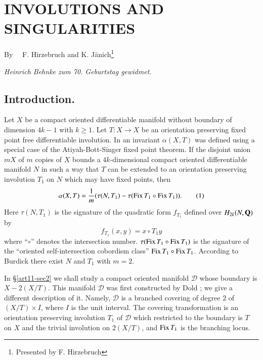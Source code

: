 \chapter[\textsc{F. Hirzebruch} and \textsc{K. J\"anich~:} Involutions and Singularities]{INVOLUTIONS AND SINGULARITIES}\label{art11}

\begin{center}
By~~ F. Hirzebruch and K. J\"anich\footnote{Presented by F. Hirzebruch}

\bigskip

{\em Heinrich Behnke zum {\rm 70.} Geburtstag gewidmet.}
\end{center}

\setcounter{pageoriginal}{218}
\section{Introduction.}\label{art11-sec1}\pageoriginale


Let $X$ be a compact oriented differentiable manifold without boundary of dimension $4k-1$ with $k\geq 1$. Let $T:X\to X$ be an orientation preserving fixed point free differentiable involution. In \cite{art11-key7} an invariant $\alpha(X,T)$ was defined using a special case of the Atiyah-Bott-Singer fixed point theorem. If the disjoint union $mX$ of $m$ copies of $X$ bounds a $4k$-dimensional compact oriented differentiable manifold $N$ in such a way that $T$ can be extended to an orientation preserving involution $T_{1}$ on $N$ which may have fixed points, then
\begin{equation*}
\alpha(X,T)=\dfrac{1}{m}(\tau(N,T_{1})- \tau(\operatorname{\mathrm{Fix}} T_{1}\circ \operatorname{\mathrm{Fix}} T_{1})).\tag{1}\label{art11-sec1-eq1}
\end{equation*}
Here $\tau(N,T_{1})$ is the signature of the quadratic form $f_{T_{1}}$ defined over $H_{2k}(N,\mathbf{Q})$ by
$$
f_{T_{1}}(x,y)=x\circ T_{1}y
$$
where ``$\circ$'' denotes the intersection number. $\tau(\operatorname{\mathrm{Fix}} T_{1}\circ \operatorname{\mathrm{Fix}} T_{1})$ is the signature of the ``oriented self-intersection cobordism class'' $\operatorname{\mathrm{Fix}} T_{1}\circ \operatorname{\mathrm{Fix}} T_{1}$. According to Burdick \cite{art11-key4} there exist $N$ and $T_{1}$ with $m=2$.

In \S\ref{art11-sec2} we shall study a compact oriented manifold $\mathscr{D}$ whose boundary is $X-2(X/T)$. This manifold $\mathscr{D}$ was first constructed by Dold \cite{art11-key5}; we give a different description of it. Namely, $\mathscr{D}$ is a branched covering of degree $2$ of $(X/T)\times I$, where $I$ is the unit interval. The covering transformation is an orientation preserving involution $T_{1}$ of $\mathscr{D}$ which restricted to the boundary is $T$ on $X$ and the trivial involution on $2(X/T)$, and $\operatorname{\mathrm{Fix}} T_{1}$ is the branching locus.

